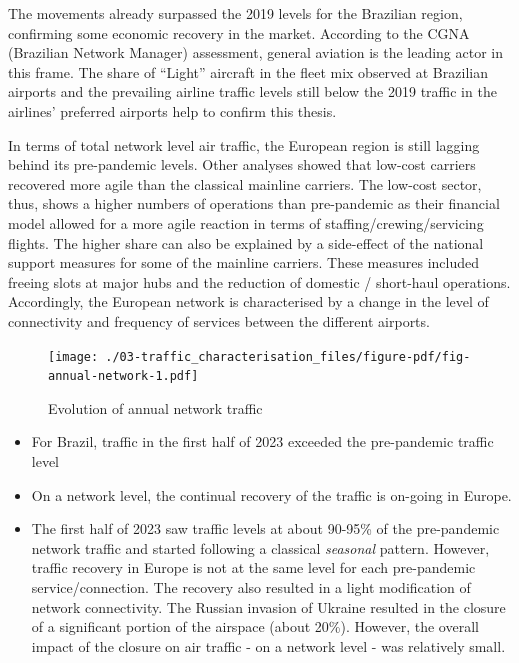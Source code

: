 \documentclass[
  a4paper,
  DIV=11,
  numbers=noendperiod]{scrreport}
\providecommand{\tightlist}{%
  \setlength{\itemsep}{0pt}\setlength{\parskip}{0pt}}\usepackage{longtable,booktabs,array}
\begin{document}
The movements already surpassed the 2019 levels for the Brazilian
region, confirming some economic recovery in the market. According to
the CGNA (Brazilian Network Manager) assessment, general aviation is the
leading actor in this frame. The share of ``Light'' aircraft in the
fleet mix observed at Brazilian airports and the prevailing airline
traffic levels still below the 2019 traffic in the airlines' preferred
airports help to confirm this thesis.

In terms of total network level air traffic, the European region is
still lagging behind its pre-pandemic levels. Other analyses showed that
low-cost carriers recovered more agile than the classical mainline
carriers. The low-cost sector, thus, shows a higher numbers of
operations than pre-pandemic as their financial model allowed for a more
agile reaction in terms of staffing/crewing/servicing flights. The
higher share can also be explained by a side-effect of the national
support measures for some of the mainline carriers. These measures
included freeing slots at major hubs and the reduction of domestic /
short-haul operations. Accordingly, the European network is
characterised by a change in the level of connectivity and frequency of
services between the different airports.

\begin{figure}[H]

{\centering \texttt{[image: ./03-traffic\_characterisation\_files/figure-pdf/fig-annual-network-1.pdf]}

}

\caption{\label{fig-annual-network}Evolution of annual network traffic}

\end{figure}

\begin{itemize}
\tightlist
\item
  For Brazil, traffic in the first half of 2023 exceeded the
  pre-pandemic traffic level
\item
  On a network level, the continual recovery of the traffic is on-going
  in Europe.
\item
  The first half of 2023 saw traffic levels at about 90-95\% of the
  pre-pandemic network traffic and started following a classical
  \emph{seasonal} pattern. However, traffic recovery in Europe is not at
  the same level for each pre-pandemic service/connection. The recovery
  also resulted in a light modification of network connectivity. The
  Russian invasion of Ukraine resulted in the closure of a significant
  portion of the airspace (about 20\%). However, the overall impact of
  the closure on air traffic - on a network level - was relatively
  small.
\end{itemize}
\end{document}
